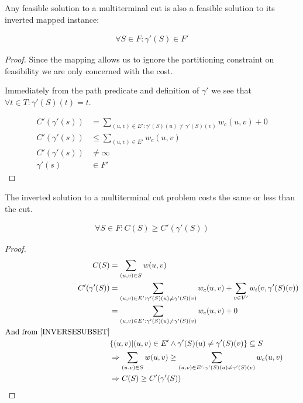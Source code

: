 \begin{lemma}
\label{INVERSEFEASIBLE}
Any feasible solution to a multiterminal cut is also a feasible solution to its inverted mapped instance:

\begin{align}
	\nonumber \forall S \in F : \gamma'(S) \in F'
\end{align}
\end{lemma}
\begin{proof}
Since the mapping allows us to ignore the partitioning constraint on feasibility we are only concerned with the cost.

Immediately from the path predicate and definition of $\gamma'$ we see that $\forall t \in T : \gamma'(S)(t) = t$.

\begin{align}
	\nonumber C'(\gamma'(s)) & = \displaystyle\sum\limits_{(u,v) \in E' : \gamma'(S)(u) \neq \gamma'(S)(v)} w_c(u,v) + 0 \\
	\nonumber C'(\gamma'(s)) & \leq \displaystyle\sum\limits_{(u,v) \in E'} w_c(u,v) \\
	\nonumber C'(\gamma'(s)) & \neq \infty \\
	\nonumber \gamma'(s) & \in F'
\end{align}
\end{proof}

\begin{lemma}
\label{INVERSECOST}
The inverted solution to a multiterminal cut problem costs the same or less than the cut.

\begin{align}
	\nonumber \forall S \in F : C(S) \geq C'(\gamma'(S))
\end{align}
\end{lemma}
\begin{proof}
\begin{align}
	\nonumber C(S) & = \displaystyle\sum\limits_{(u,v) \in S} w(u,v)\\
	\nonumber C'(\gamma'(S)) & = \displaystyle\sum\limits_{(u,v) \in E' : \gamma'(S)(u) \neq \gamma'(S)(v)} w_c(u,v) + \displaystyle\sum\limits_{v \in V'} w_i(v, \gamma'(S)(v)) \\
	\nonumber & = \displaystyle\sum\limits_{(u,v) \in E' : \gamma'(S)(u) \neq \gamma'(S)(v)} w_c(u,v) + 0 \\
	\nonumber \mbox{And from \ref{INVERSESUBSET}} \\
	\nonumber & \{(u,v) | (u,v) \in E' \wedge \gamma'(S)(u) \neq \gamma'(S)(v)\} \subseteq S \\
	\nonumber & \Rightarrow \displaystyle\sum\limits_{(u,v) \in S} w(u,v) \geq \displaystyle\sum\limits_{(u,v) \in E' : \gamma'(S)(u) \neq \gamma'(S)(v)} w_c(u,v) \\
	\nonumber & \Rightarrow C(S) \geq C'(\gamma'(S))
\end{align}
\end{proof}

